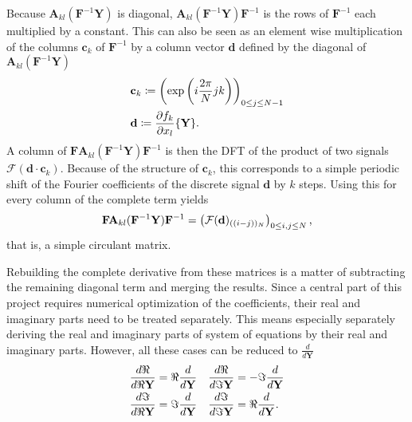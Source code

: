 Because $\mathbf A_{kl}(\mathbf{F}^{-1} \mathbf{Y})$ is diagonal, $\mathbf A_{kl}(\mathbf{F}^{-1} \mathbf{Y}) \mathbf{F}^{-1}$ is the rows of $\mathbf F^{-1}$ each multiplied by a constant.
This can also be seen as an element wise multiplication of the columns $\mathbf c_k$ of $\mathbf F^{-1}$ by a column vector $\mathbf d$ defined by the diagonal of $\mathbf A_{kl}(\mathbf{F}^{-1} \mathbf{Y})$
	\begin{align*}
		&\mathbf c_k \coloneqq \left(\exp\left(i\frac{2\pi}{N} j k\right)\right)_{0 \le j \le N-1}\\
		&\mathbf d \coloneqq \frac{\partial f_k}{\partial x_l} \{\mathbf Y\} \text.
	\end{align*}
A column of $\mathbf{F} \mathbf A_{kl}(\mathbf{F}^{-1} \mathbf{Y}) \mathbf{F}^{-1}$ is then the DFT of the product of two signals $\mathcal F(\mathbf d \cdot \mathbf c_k)$.
Because of the structure of $\mathbf c_k$, this corresponds to a simple periodic shift of the Fourier coefficients of the discrete signal $\mathbf d$ by $k$ steps.
Using this for every column of the complete term yields
	\[
			\mathbf{F} \mathbf A_{kl}(\mathbf{F}^{-1} \mathbf{Y}) \mathbf{F}^{-1} = \left( \mathbf {\mathcal{F}}(\mathbf d)_{((i-j))_N} \right)_{0 \le i,j \le N} \text,
	\]
that is, a simple circulant matrix.

Rebuilding the complete derivative from these matrices is a matter of subtracting the remaining diagonal term and merging the results.
Since a central part of this project requires numerical optimization of the coefficients, their real and imaginary parts need to be treated separately.
This means especially separately deriving the real and imaginary parts of system of equations by their real and imaginary parts.
However, all these cases can be reduced to $\frac{d}{d \mathbf Y}$
\begin{align*}
	\frac{d \Re}{d\Re \mathbf Y} = \Re \frac{d}{d \mathbf Y} &&& \frac{d \Re}{d\Im \mathbf Y} = -\Im \frac{d}{d \mathbf Y}\\
	\frac{d \Im}{d\Re \mathbf Y} = \Im \frac{d}{d \mathbf Y} &&& \frac{d \Im}{d\Im \mathbf Y} = \Re \frac{d}{d \mathbf Y} \text.
\end{align*}